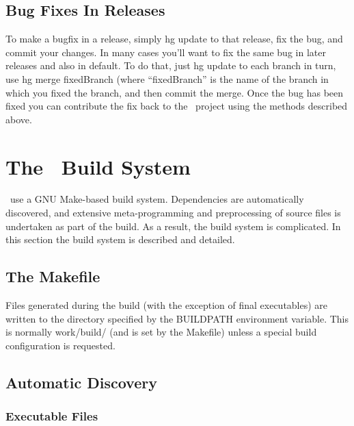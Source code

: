 \subsection{Bug Fixes In Releases}

To make a bugfix in a release, simply {\normalfont \ttfamily hg update} to that release, fix the bug, and commit your changes. In many cases you'll want to fix the same bug in later releases and also in {\normalfont \ttfamily default}. To do that, just {\normalfont \ttfamily hg update} to each branch in turn, use {\normalfont \ttfamily hg merge fixedBranch} (where ``{\normalfont \ttfamily fixedBranch}'' is the name of the branch in which you fixed the branch, and then commit the merge. Once the bug has been fixed you can contribute the fix back to the \glc\ project using the methods described above.

\section{The \glc\ Build System}

\glc\ use a GNU Make-based build system. Dependencies are automatically discovered, and extensive meta-programming and preprocessing of source files is undertaken as part of the build. As a result, the build system is complicated. In this section the build system is described and detailed.

\subsection{The Makefile}

Files generated during the build (with the exception of final executables) are written to the directory specified by the {\normalfont \ttfamily BUILDPATH} environment variable. This is normally {\normalfont \ttfamily work/build/} (and is set by the {\normalfont \ttfamily Makefile}) unless a special build configuration is requested.

\subsection{Automatic Discovery}

\subsubsection{Executable Files}\label{sec:buildExecutables}

